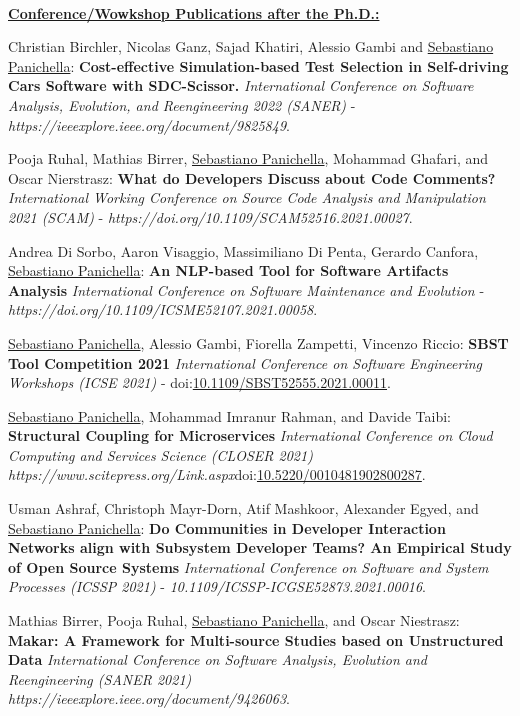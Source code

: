 \documentclass[10pt]{article}
\newcommand\doilink[1]{\href{http://dx.doi.org/#1}{#1}}
\newcommand\doi[1]{doi:\doilink{#1}}
\begin{document}
\textbf{\\\underline{Conference/Wowkshop Publications after the Ph.D.:}}\\
\begin{bibenum}
  		\item \label{Cm24} Christian Birchler, Nicolas Ganz, Sajad Khatiri, Alessio Gambi and \underline{Sebastiano Panichella}:  \textbf{Cost-effective Simulation-based Test Selection in Self-driving Cars Software with SDC-Scissor.}  \emph{International Conference on Software Analysis, Evolution, and Reengineering 2022 (SANER)} - \textit{https://ieeexplore.ieee.org/document/9825849}. 
  		\item \label{Cm23} Pooja Ruhal, Mathias Birrer, \underline{Sebastiano Panichella}, Mohammad Ghafari, and Oscar Nierstrasz:  \textbf{What do Developers Discuss about Code Comments?}  \emph{International Working Conference on Source Code Analysis and Manipulation 2021 (SCAM)} - \textit{https://doi.org/10.1109/SCAM52516.2021.00027}.
 		\item \label{Cm22} Andrea Di Sorbo, Aaron Visaggio, Massimiliano Di Penta, Gerardo Canfora, \underline{Sebastiano Panichella}:  \textbf{An NLP-based Tool for Software Artifacts Analysis}  \emph{International Conference on Software Maintenance and Evolution} - \\\textit{https://doi.org/10.1109/ICSME52107.2021.00058}.
 		\item \label{Cm21} \underline{Sebastiano Panichella}, Alessio Gambi, Fiorella Zampetti, Vincenzo Riccio:  \textbf{SBST Tool Competition 2021}  \emph{International Conference on Software Engineering Workshops (ICSE 2021)} - \doi{10.1109/SBST52555.2021.00011}. 
       \item \label{Cm20} \underline{Sebastiano Panichella}, Mohammad Imranur Rahman, and Davide Taibi:  \textbf{Structural Coupling for Microservices}  \emph{International Conference on Cloud Computing and Services Science (CLOSER 2021)}\\ \textit{https://www.scitepress.org/Link.aspx}\doi{10.5220/0010481902800287}. 
       \item \label{Cm19} Usman Ashraf, Christoph Mayr-Dorn, Atif Mashkoor, Alexander Egyed, and \underline{Sebastiano Panichella}:  \textbf{Do Communities in Developer Interaction Networks align with Subsystem Developer Teams? An Empirical Study of Open Source Systems}  \emph{International Conference on Software and System Processes (ICSSP 2021)} - \textit{10.1109/ICSSP-ICGSE52873.2021.00016}.   
      \item \label{Cm17_2} Mathias Birrer, Pooja Ruhal, \underline{Sebastiano Panichella}, and Oscar Niestrasz:  \textbf{Makar: A Framework for Multi-source Studies based on Unstructured Data}  \emph{International Conference on Software Analysis, Evolution and Reengineering (SANER 2021)}\\ \textit{https://ieeexplore.ieee.org/document/9426063}.   

\end{bibenum}
\end{document}
